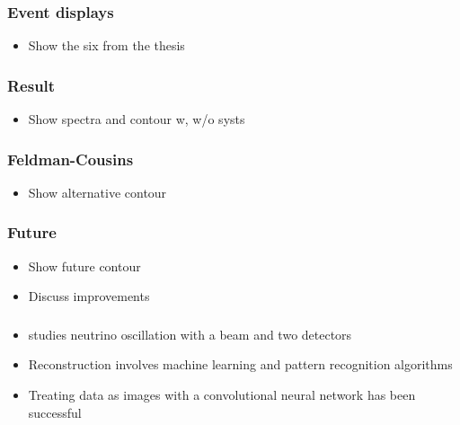 \documentclass[10pt,professionalfonts,xcolor=table]{beamer}
\begin{document}
\begin{frame}
\frametitle{Event displays}
\begin{itemize}
\item Show the six from the thesis
\end{itemize}
\end{frame}

\begin{frame}
\frametitle{Result}
\begin{itemize}
\item Show spectra and contour w, w/o systs
\end{itemize}
\end{frame}

\begin{frame}
\frametitle{Feldman-Cousins}
\begin{itemize}
\item Show alternative contour
\end{itemize}
\end{frame}


\begin{frame}
\frametitle{Future}
\begin{itemize}
\item Show future contour
\item Discuss improvements
\end{itemize}
\end{frame}


\begin{frame}
\frametitle{}
\begin{itemize}
\item \nova studies neutrino oscillation with a beam and two detectors
\gap
\item Reconstruction involves machine learning and pattern recognition algorithms
\gap
\item Treating data as images with a convolutional neural network has been successful
\end{itemize}
\end{frame}
\end{document}

